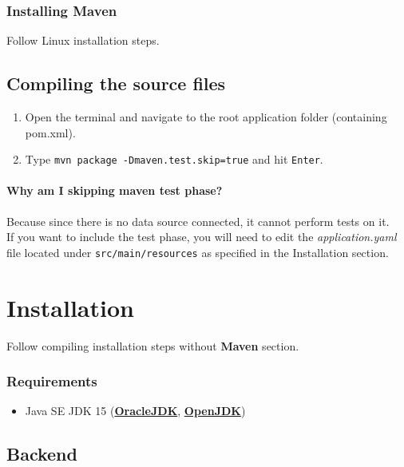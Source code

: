 \documentclass[table, 12pt]{article}
\begin{document}
\subsubsection{Installing Maven}\label{installing-maven-2}

Follow Linux installation steps.


\subsection{Compiling the source files}
\begin{enumerate}
    \item Open the terminal and navigate to the root application folder (containing pom.xml).
    \item Type \texttt{mvn package -Dmaven.test.skip=true} and hit \texttt{Enter}.
\end{enumerate}
\paragraph{Why am I skipping maven test phase?}
Because since there is no data source connected, it cannot perform tests on it.\\
If you want to include the test phase, you will need to edit the \textit{application.yaml} file located under \texttt{src/main/resources} as specified in the Installation section. 



\section{Installation}\label{using-the-self-contained-installer-recommended}
Follow compiling installation steps without \textbf{Maven} section.
\subsubsection{Requirements}
\begin{itemize}
    \item Java SE JDK 15 (\textbf{\href{https://jdk.java.net/15/}{OracleJDK}}, \textbf{\href{https://openjdk.java.net/projects/jdk/15/}{OpenJDK}})
\end{itemize}
\subsection{Backend}
\end{document}
